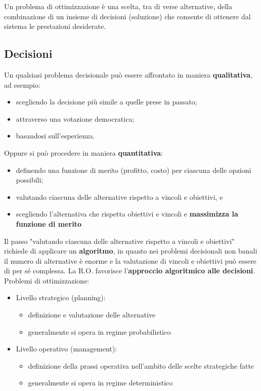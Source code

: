 \documentclass[12pt]{extarticle} %
\begin{document}
\noindent Un problema di ottimizzazione è una scelta, tra di verse alternative, della combinazione di un insieme di decisioni (soluzione) che consente di ottenere dal sistema le prestazioni desiderate.

\subsection{Decisioni}
Un qualsiasi problema decisionale può essere affrontato in maniera \textbf{qualitativa}, ad esempio:
\begin{itemize}
    \item scegliendo la decisione più simile a quelle prese in passato;
    \item attraverso una votazione democratica;
    \item basandosi sull'esperienza.
\end{itemize}
Oppure si può procedere in maniera \textbf{quantitativa}:
\begin{itemize}
    \item definendo una funzione di merito (profitto, costo) per ciascuna delle opzioni possibili;
    \item valutando ciascuna delle alternative rispetto a vincoli e obiettivi, e
    \item scegliendo l'alternativa che rispetta obiettivi e vincoli e \textbf{massimizza la funzione di merito}
\end{itemize}
Il passo "valutando ciascuna delle alternative rispetto a vincoli e obiettivi" richiede di applicare un \textbf{algoritmo}, in quanto nei problemi decisionali non banali il numero di alternative è enorme e la valutazione di vincoli e obiettivi può essere di per sé complessa. La R.O. favorisce l'\textbf{approccio algoritmico alle decisioni}.\\

\noindent Problemi di ottimizzazione:
\begin{itemize}
    \item Livello strategico (planning):
    \begin{itemize}
        \item definizione e valutazione delle alternative
        \item generalmente si opera in regime probabilistico
    \end{itemize}

    \item Livello operativo (management):
    \begin{itemize}
        \item definizione della prassi operativa nell'ambito delle scelte strategiche fatte
        \item generalmente si opera in regime deterministico
    \end{itemize}
\end{itemize}
\end{document}
